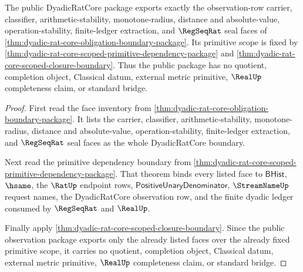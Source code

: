 \begin{theorem}
\label{thm:dyadicratcore-public-observation-package}
The public DyadicRatCore package exports exactly the observation-row carrier,
classifier, arithmetic-stability, monotone-radius, distance and absolute-value,
operation-stability, finite-ledger extraction, and $\RegSeqRat$ seal faces of
\autoref{thm:dyadic-rat-core-obligation-boundary-package}. Its primitive scope is
fixed by \autoref{thm:dyadic-rat-core-scoped-primitive-dependency-package} and
\autoref{thm:dyadic-rat-core-scoped-closure-boundary}. Thus the public package
has no quotient, completion object, Classical datum, external metric primitive,
$\RealUp$ completeness claim, or standard bridge.
\end{theorem}
\begin{proof}
First read the face inventory from
\autoref{thm:dyadic-rat-core-obligation-boundary-package}. It lists the carrier,
classifier, arithmetic-stability, monotone-radius, distance and absolute-value,
operation-stability, finite-ledger extraction, and $\RegSeqRat$ seal faces as the
whole DyadicRatCore boundary.

Next read the primitive dependency boundary from
\autoref{thm:dyadic-rat-core-scoped-primitive-dependency-package}. That theorem
binds every listed face to $\mathsf{BHist}$, $\hsame$, the $\RatUp$ endpoint
rows, $\mathsf{PositiveUnaryDenominator}$, $\StreamNameUp$ request names, the
DyadicRatCore observation row, and the finite dyadic ledger consumed by
$\RegSeqRat$ and $\RealUp$.

Finally apply \autoref{thm:dyadic-rat-core-scoped-closure-boundary}. Since the
public observation package exports only the already listed faces over the
already fixed primitive scope, it carries no quotient, completion object,
Classical datum, external metric primitive, $\RealUp$ completeness claim, or
standard bridge.
\end{proof}

